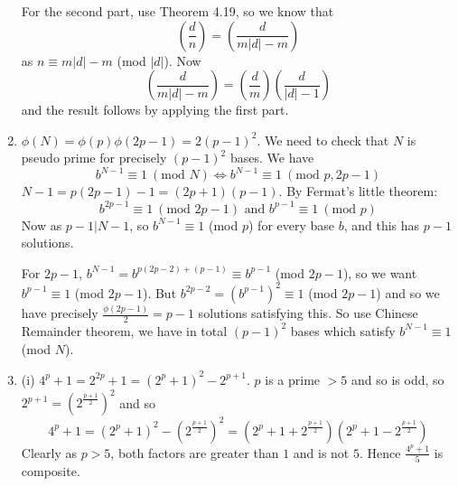 \begin{enumerate}
    For the second part, use Theorem 4.19, so we know that
    $$\left(\frac{d}{n}\right) = \left(\frac{d}{m|d|-m}\right)$$
    as $n \equiv m|d|-m$ (mod $|d|$). Now
    $$\left(\frac{d}{m|d|-m}\right)=\left(\frac{d}{m}\right)\left(\frac{d}{|d|-1}\right)$$
    and the result follows by applying the first part.
\item $\phi(N)=\phi(p)\phi(2p-1)=2(p-1)^2$. We need to check that $N$ is pseudo prime for precisely
    $(p-1)^2$ bases. We have
    $$b^{N-1} \equiv 1~(\text{mod } N) \iff b^{N-1} \equiv 1~(\text{mod } p,2p-1)$$
    $N-1=p(2p-1)-1=(2p+1)(p-1)$. By Fermat's little theorem:
    $$b^{2p-1} \equiv 1~(\text{mod }2p-1) \text{ and } b^{p-1} \equiv 1~(\text{mod }p)$$
    Now as $p-1|N-1$, so $b^{N-1} \equiv 1$ (mod $p$) for every base $b$, and this has $p-1$ solutions.

    For $2p-1$, $b^{N-1} = b^{p(2p-2) +(p-1)} \equiv b^{p-1}$ (mod $2p-1$), so we want
    $b^{p-1} \equiv 1$ (mod $2p-1$). But $b^{2p-2} = (b^{p-1})^2 \equiv 1$ (mod $2p-1$) and so we have precisely $\frac{\phi(2p-1)}{2}=p-1$ solutions satisfying this. So use Chinese Remainder theorem, we have in total $(p-1)^2$ bases which satisfy $b^{N-1} \equiv 1$ (mod $N$).\\
\item (i) $4^p+1=2^{2p}+1=(2^{p}+1)^2-2^{p+1}$. $p$ is a prime $>5$ and so is odd,
    so $2^{p+1}=(2^{\frac{p+1}{2}})^2$ and so
    $$4^p+1=(2^{p}+1)^2-(2^{\frac{p+1}{2}})^2=(2^{p}+1+2^{\frac{p+1}{2}})(2^{p}+1-2^{\frac{p+1}{2}})$$
    Clearly as $p>5$, both factors are greater than $1$ and is not $5$. Hence
    $\frac{4^p+1}{5}$ is composite.


\end{enumerate}
